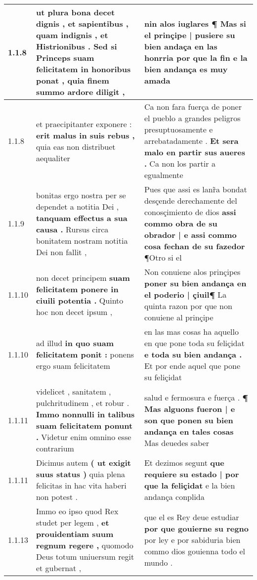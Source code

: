 \begin{tabular}{|p{1cm}|p{6.5cm}|p{6.5cm}|}
1.1.8 & ut plura bona decet dignis , et sapientibus , quam indignis , et Histrionibus . \textbf{ Sed si Princeps suam felicitatem in honoribus ponat , } quia finem summo ardore diligit , & nin alos iuglares ¶ \textbf{ Mas si el prinçipe | pusiere su bien andaça en las honrria } por que la fin e la bien andança es muy amada \\\hline
1.1.8 & et praecipitanter exponere : \textbf{ erit malus in suis rebus , } quia eas non distribuet aequaliter & Ca non fara fuerça de poner el pueblo a grandes peligros presuptuosamente e arrebatadamente . \textbf{ Et sera malo en partir sus aueres . } Ca non los partir a egualmente \\\hline
1.1.9 & bonitas ergo nostra per se dependet a notitia Dei , \textbf{ tanquam effectus a sua causa . } Rursus circa bonitatem nostram notitia Dei non fallit , & Pues que assi es lanr̃a bondat desçende derechamente del conosçimiento de dios \textbf{ assi commo obra de su obrador | e assi commo cosa fechan de su fazedor } ¶Otro si el \\\hline
1.1.10 & non decet principem \textbf{ suam felicitatem ponere in ciuili potentia . } Quinto hoc non decet ipsum , & Non conuiene alos prinçipes \textbf{ poner su bien andança en el poderio | çiuil¶ } La quinta razon por que non conuiene al prinçipe \\\hline
1.1.10 & ad illud \textbf{ in quo suam felicitatem ponit : } ponens ergo suam felicitatem & en las mas cosas ha aquello en que pone toda su feliçidat \textbf{ e toda su bien andança . } Et por ende aquel que pone su feliçidat \\\hline
1.1.11 & videlicet , sanitatem , pulchritudinem , et robur . \textbf{ Immo nonnulli in talibus suam felicitatem ponunt . } Videtur enim omnino esse contrarium & salud e fermosura e fuerça . \textbf{ ¶ Mas alguons fueron | e son que ponen su bien andança en tales cosas } Mas deuedes saber \\\hline
1.1.11 & Dicimus autem \textbf{ ( ut exigit suus status ) } quia plena felicitas in hac vita haberi non potest . & Et dezimos segunt \textbf{ que requiere su estado | por que la feliçidat } e la bien andança conplida \\\hline
1.1.13 & Immo eo ipso quod Rex studet per legem , \textbf{ et prouidentiam suum regnum regere , } quomodo Deus totum uniuersum regit et gubernat , & que el es Rey deue estudiar \textbf{ por que gouierne su regno } por ley e por sabiduria bien commo dios gouienna todo el mundo . \\\hline

\end{tabular}
